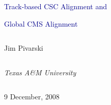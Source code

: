 \documentclass[compress]{beamer}
\begin{document}
\begin{frame}
\vfill
\begin{center}
\textcolor{darkblue}{\Large Track-based CSC Alignment and}

\vspace{0.2 cm}
\textcolor{darkblue}{\Large Global CMS Alignment}

\vfill
\begin{columns}
\begin{center}
\large
Jim Pivarski
\end{center}
\end{columns}

\begin{columns}
\begin{center}
\scriptsize
{\it Texas A\&M University}
\end{center}
\end{columns}

\vfill
 9 December, 2008

\end{center}
\end{frame}


\small
\end{document}
